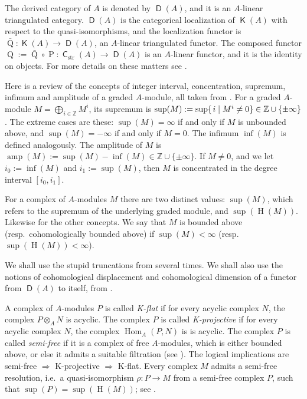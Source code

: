 \documentclass[10pt]{amsart}
\theoremstyle{definition}
\numberwithin{equation}{section}
\newcommand{\opn}{\operatorname}
\newcommand{\cat}[1]{\operatorname{\mathsf{#1}}}
\newcommand{\mrm}[1]{\mathrm{#1}}
\newcommand{\Z}{\mathbb{Z}}
\newcommand{\ot}{\otimes}
\newcommand{\msp}[1]{\mspace{#1 mu}}
\begin{document}
The  derived category of $A$ is denoted by $\cat{D}(A)$, and it is
an $A$-linear triangulated category. $\cat{D}(A)$ is the categorical
localization of $\cat{K}(A)$ with respect to the quasi-isomorphisms, and the
localization functor is $\bar{\opn{Q}} : \cat{K}(A) \to \cat{D}(A)$,
an $A$-linear triangulated functor.
The composed functor
$\opn{Q} := \bar{\opn{Q}} \circ \opn{P} : \cat{C}_{\mrm{str}}(A)
\to \cat{D}(A)$
is an $A$-linear functor, and it is the identity on objects.
For more details on these matters see \cite[Chapters 3, 5, 7]{Ye5}.

Here is a review of the concepts of integer
interval, concentration, supremum, infimum and amplitude of a graded
$A$-module, all taken from \cite[Sections 12.1 and 12.4]{Ye5}.
For a graded $A$-module
$M = \bigoplus_{i \in \Z} M^i$,
its supremum is
$\opn{sup}(M) := \opn{sup} \{ \msp{2} i \mid M^i \neq 0 \} \in
\Z \cup \{ \pm \infty \}$.
The extreme cases are these:
$\opn{sup}(M) = \infty$ if and only if $M$ is unbounded above, and
$\opn{sup}(M) = -\infty$ if and only if $M = 0$.
The infimum $\opn{inf}(M)$ is defined analogously.
The amplitude of $M$ is
$\opn{amp}(M) := \opn{sup}(M) - \opn{inf}(M) \in \Z \cup \{ \pm \infty \}$.
If $M \neq 0$, and we let
$i_0 := \opn{inf}(M)$ and  $i_1 := \opn{sup}(M)$, then $M$ is concentrated in
the degree interval $[i_0, i_1]$.

For a complex of $A$-modules $M$ there are two distinct values:
$\opn{sup}(M)$, which refers to the supremum of the underlying graded
module, and $\opn{sup}(\opn{H}(M))$. Likewise for the other concepts.
We say that $M$ is bounded above (resp.\ cohomologically bounded above) if
$\opn{sup}(M) < \infty$ (resp.\ $\opn{sup}(\opn{H}(M)) < \infty$).

We shall use the stupid truncations from \cite[Definition 11.2.1]{Ye5} several
times. We shall also use the notions of cohomological displacement and
cohomological dimension of a functor from $\cat{D}(A)$ to itself, from
\cite[Section 12.4]{Ye5}.

A complex of $A$-modules $P$ is called {\em K-flat} if for every acyclic complex
$N$, the complex $P \ot_{A} N$ is acyclic. The complex $P$ is
called {\em K-projective} if for every acyclic complex $N$, the complex
$\opn{Hom}_{A}(P, N)$ is is acyclic. The complex $P$ is called {\em semi-free}
if it is a complex of free $A$-modules, which is either bounded above,
or else it admits a suitable filtration (see \cite[Definition 11.4.3]{Ye5}).
The logical implications are semi-free $\Rightarrow$ K-projective
$\Rightarrow$ K-flat.
Every complex $M$ admits a semi-free resolution, i.e.\ a quasi-isomorphism
$\rho : P \to M$ from a semi-free complex $P$, such that
$\opn{sup}(P) = \opn{sup}(\opn{H}(M))$; see \cite[Corollary 11.4.27]{Ye5}.
\end{document}
